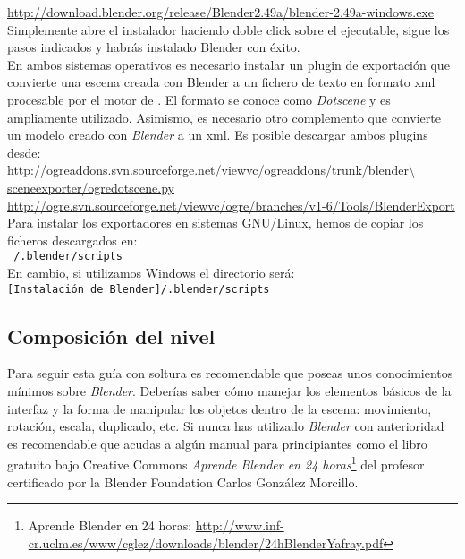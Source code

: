 \url{http://download.blender.org/release/Blender2.49a/blender-2.49a-windows.exe}\\

Simplemente abre el instalador haciendo doble click sobre el ejecutable,
sigue los pasos indicados y habrás instalado Blender con éxito.\\

En ambos sistemas operativos es necesario instalar un plugin de exportación
que convierte una escena creada con Blender a un fichero de texto en formato
xml procesable por el motor de \juego. El formato se conoce como \textit{Dotscene}
y es ampliamente utilizado. Asimismo, es necesario otro complemento que
convierte un modelo creado con \textit{Blender} a un xml. Es posible
descargar ambos plugins desde:\\

\url{http://ogreaddons.svn.sourceforge.net/viewvc/ogreaddons/trunk/blender\
sceneexporter/ogredotscene.py}\\

\url{http://ogre.svn.sourceforge.net/viewvc/ogre/branches/v1-6/Tools/BlenderExport}\\

Para instalar los exportadores en sistemas GNU/Linux, hemos de copiar los ficheros
descargados en:\\

\texttt{~/.blender/scripts}\\

En cambio, si utilizamos Windows el directorio será:\\

\texttt{[Instalación de Blender]/.blender/scripts}\\


\subsection*{Composición del nivel}

Para seguir esta guía con soltura es recomendable que poseas unos conocimientos
mínimos sobre \textit{Blender}. Deberías saber cómo manejar los elementos
básicos de la interfaz y la forma de manipular los objetos dentro de la
escena: movimiento, rotación, escala, duplicado, etc. Si nunca has utilizado
\textit{Blender} con anterioridad es recomendable que acudas a algún
manual para principiantes como el libro gratuito bajo Creative Commons
\textit{Aprende Blender en 24 horas}\footnote{Aprende Blender en 24 horas: 
\url{http://www.inf-cr.uclm.es/www/cglez/downloads/blender/24hBlenderYafray.pdf}}
del profesor certificado por la Blender Foundation Carlos González Morcillo.

